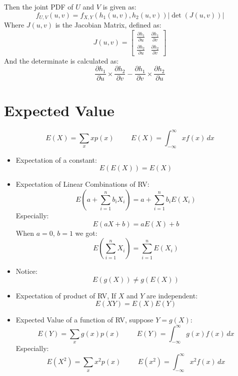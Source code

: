\documentclass[12pt]{article}
\begin{document}
\begin{multicols*}{4}
\begin{tcolorbox}[title=Bivariate Transformation Method]
        Then the joint PDF of $U$ and $V$ is given as:
        $$f_{U, V}(u, v)=f_{X, Y}(h_1(u, v), h_2(u, v))\left|\det(J(u, v))\right|$$
        Where $J(u, v)$ is the Jacobian Matrix, defined as:
        $$J(u, v)=\left[\begin{matrix}
                    \frac{\partial h_1}{\partial u} & \frac{\partial h_1}{\partial v} \\
                    \frac{\partial h_2}{\partial u} & \frac{\partial h_2}{\partial v}
                \end{matrix}\right]$$
        And the determinate is calculated as:
        $$\frac{\partial h_1}{\partial u}\times\frac{\partial h_2}{\partial v}-\frac{\partial h_1}{\partial v}\times\frac{\partial h_2}{\partial u}$$
    \end{tcolorbox}
    \section{Expected Value}
    $$E(X)=\sum_xxp(x)\hspace{1cm}E(X)=\int_{-\infty}^\infty xf(x)\,dx$$
    \begin{tcolorbox}[title=Properties of Expected Value]
        \begin{itemize}[leftmargin=*]
            \item Expectation of a constant:
                  $$E(E(X))= E(X)$$
            \item Expectation of Linear Combinations of RV:
                  $$E\left(a+\sum_{i=1}^nb_iX_i\right)=a+\sum_{i=1}^nb_iE(X_i)$$
                  Especially:
                  $$E(aX+b)=aE(X)+b$$
                  When $a=0$, $b=1$ we got:
                  $$E\left(\sum_{i=1}^nX_i\right)=\sum_{i=1}^nE(X_i)$$
            \item Notice:
                  $$E(g(X))\neq g(E(X))$$
            \item Expectation of product of RV, If $X$ and $Y$ are independent:
                  $$E(XY)=E(X)E(Y)$$
            \item Expected Value of a function of RV, suppose $Y=g(X)$:
                  $$E(Y)=\sum_xg(x)p(x)\hspace{1cm}E(Y)=\int_{-\infty}^\infty g(x)f(x)\,dx$$
                  Especially:
                  $$E(X^2)=\sum_xx^2p(x)\hspace{1cm}E(x^2)=\int_{-\infty}^\infty x^2f(x)\,dx$$
        \end{itemize}
    \end{tcolorbox}
    \begin{tcolorbox}[title=Conditional Expectation]

\end{tcolorbox}
\end{multicols*}
\end{document}
